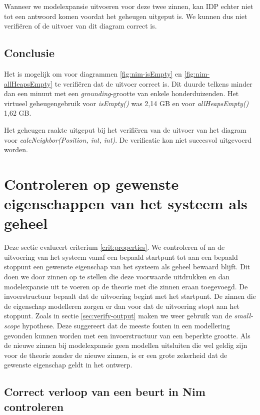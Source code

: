 Wanneer we modelexpansie uitvoeren voor deze twee zinnen, kan IDP echter niet tot een antwoord komen voordat het geheugen uitgeput is. We kunnen dus niet verifi\"eren of de uitvoer van dit diagram correct is.

\subsection{Conclusie}

Het is mogelijk om voor diagrammen \ref{fig:nim-isEmpty} en \ref{fig:nim-allHeapsEmpty} te verifi\"eren dat de uitvoer correct is. Dit duurde telkens minder dan een minuut met een \textit{grounding}-grootte van enkele honderduizenden. Het virtueel geheugengebruik voor \textit{isEmpty()} was 2,14 GB en voor \textit{allHeapsEmpty()} 1,62 GB.

Het geheugen raakte uitgeput bij het verifi\"eren van de uitvoer van het diagram voor \textit{calcNeighbor(Position, int, int)}. De verificatie kon niet succesvol uitgevoerd worden.

\section{Controleren op gewenste eigenschappen van het systeem als geheel}

Deze sectie evalueert criterium \ref{crit:properties}. We controleren of na de uitvoering van het systeem vanaf een bepaald startpunt tot aan een bepaald stoppunt een gewenste eigenschap van het systeem als geheel bewaard blijft. Dit doen we door zinnen op te stellen die deze voorwaarde uitdrukken en dan modelexpansie uit te voeren op de theorie met die zinnen eraan toegevoegd. De invoerstructuur bepaalt dat de uitvoering begint met het startpunt. De zinnen die de eigenschap modelleren zorgen er dan voor dat de uitvoering stopt aan het stoppunt. Zoals in sectie \ref{sec:verify-output} maken we weer gebruik van de \textit{small-scope} hypothese. Deze suggereert dat de meeste fouten in een modellering gevonden kunnen worden met een invoerstructuur van een beperkte grootte. Als de nieuwe zinnen bij modelexpansie geen modellen uitsluiten die wel geldig zijn voor de theorie zonder de nieuwe zinnen, is er een grote zekerheid dat de gewenste eigenschap geldt in het ontwerp.

\subsection{Correct verloop van een beurt in Nim controleren}

